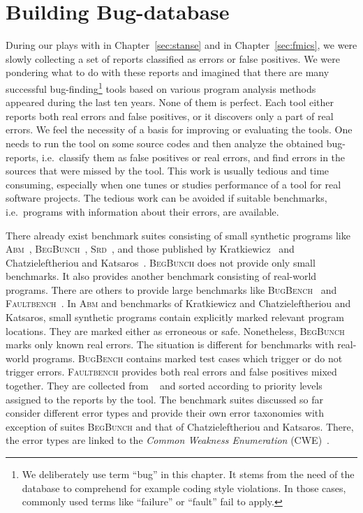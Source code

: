 
\chapter{Building Bug-database}\label{sec:clabure}
During our plays with \stan in Chapter~\ref{sec:stanse} and \symbio in
Chapter~\ref{sec:fmics}, we were slowly collecting a set of reports classified
as errors or false positives. We were pondering what to do with these reports
and imagined that there are many successful bug-finding\footnote{We
deliberately use term ``bug'' in this chapter. It stems from the need of the
database to comprehend for example coding style violations. In those cases,
commonly used terms like ``failure'' or ``fault'' fail to apply.} tools based
on various program analysis methods appeared during the last ten years.  None
of them is perfect. Each tool either reports both real errors and false
positives, or it discovers only a part of real errors. We feel the necessity
of a basis for improving or evaluating the tools.  One needs to run the tool
on some source codes and then analyze the obtained bug-reports, i.e.\ classify
them as false positives or real errors, and find errors in the sources that
were missed by the tool. This work is usually tedious and time consuming,
especially when one tunes or studies performance of a tool for real software
projects. The tedious work can be avoided if suitable benchmarks, i.e.\
programs with information about their errors, are available.

There already exist benchmark suites consisting of small synthetic programs
like \textsc{Abm}~\cite{abm}, \textsc{BegBunch}~\cite{begbunch},
\textsc{Srd}~\cite{srd}, and those published by Kratkiewicz~\cite{KRA05} and
Chatzieleftheriou and Katsaros~\cite{CHK11}. \textsc{BegBunch} does not
provide only small benchmarks. It also provides another benchmark consisting
of real-world programs. There are others to provide large benchmarks like
\textsc{BugBench}~\cite{bugbench} and \textsc{Faultbench}~\cite{HW08}. In
\textsc{Abm} and benchmarks of Kratkiewicz and Chatzieleftheriou and Katsaros,
small synthetic programs contain explicitly marked relevant program locations.
They are marked either as erroneous or safe. Nonetheless, \textsc{BegBunch}
marks only known real errors. The situation is different for benchmarks with
real-world programs. \textsc{BugBench} contains marked test cases
which trigger or do not trigger errors. \textsc{Faultbench} provides both real
errors and false positives mixed together. They are collected from
\fbugs~\cite{findbugs} and sorted according to priority levels assigned to the
reports by the tool. The benchmark suites discussed so far consider different
error types and provide their own error taxonomies with exception of suites
\textsc{BegBunch} and that of Chatzieleftheriou and Katsaros. There, the error
types are linked to the \emph{Common Weakness Enumeration} (CWE)~\cite{cwe}.

